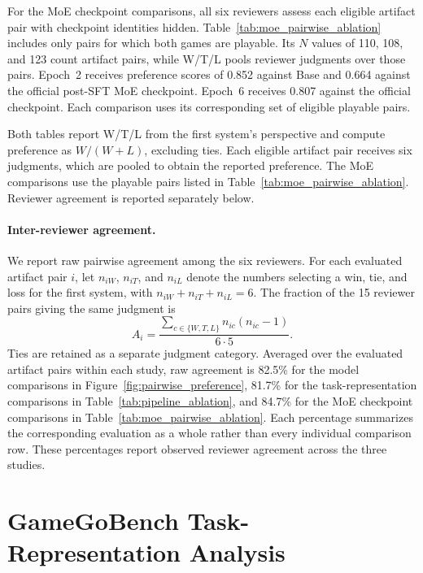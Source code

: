 \documentclass{article}
\begin{document}
For the MoE checkpoint comparisons, all six reviewers assess each eligible artifact pair with checkpoint identities hidden. Table~\ref{tab:moe_pairwise_ablation} includes only pairs for which both games are playable. Its $N$ values of 110, 108, and 123 count artifact pairs, while W/T/L pools reviewer judgments over those pairs. Epoch~2 receives preference scores of 0.852 against Base and 0.664 against the official post-SFT MoE checkpoint. Epoch~6 receives 0.807 against the official checkpoint. Each comparison uses its corresponding set of eligible playable pairs.

Both tables report W/T/L from the first system's perspective and compute preference as $W/(W+L)$, excluding ties. Each eligible artifact pair receives six judgments, which are pooled to obtain the reported preference. The MoE comparisons use the playable pairs listed in Table~\ref{tab:moe_pairwise_ablation}. Reviewer agreement is reported separately below.


\paragraph{Inter-reviewer agreement.}
We report raw pairwise agreement among the six reviewers. For each evaluated artifact pair $i$, let $n_{iW}$, $n_{iT}$, and $n_{iL}$ denote the numbers selecting a win, tie, and loss for the first system, with $n_{iW}+n_{iT}+n_{iL}=6$. The fraction of the 15 reviewer pairs giving the same judgment is
\begin{equation}
    A_i=\frac{\sum_{c\in\{W,T,L\}}n_{ic}(n_{ic}-1)}{6\cdot5}.
    \label{eq:reviewer_raw_agreement}
\end{equation}
Ties are retained as a separate judgment category. Averaged over the evaluated artifact pairs within each study, raw agreement is 82.5\% for the model comparisons in Figure~\ref{fig:pairwise_preference}, 81.7\% for the task-representation comparisons in Table~\ref{tab:pipeline_ablation}, and 84.7\% for the MoE checkpoint comparisons in Table~\ref{tab:moe_pairwise_ablation}. Each percentage summarizes the corresponding evaluation as a whole rather than every individual comparison row. These percentages report observed reviewer agreement across the three studies.

\section{GameGoBench Task-Representation Analysis}
\label{app:static_specification_analysis}
\end{document}

